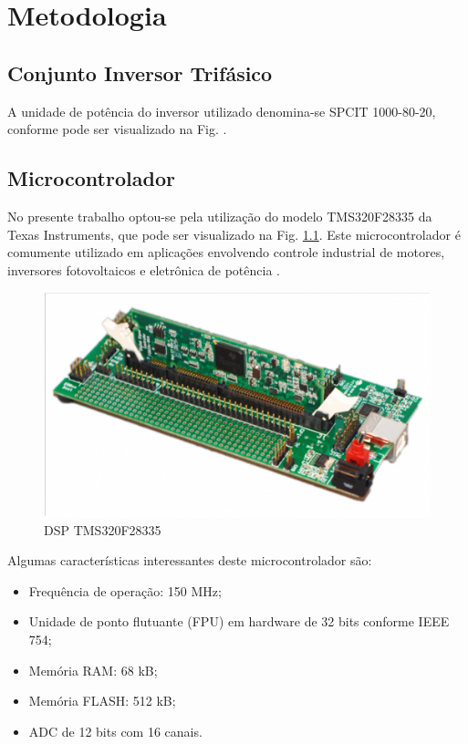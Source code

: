 \chapter{Metodologia}

\section{Conjunto Inversor Trifásico}

A unidade de potência do inversor utilizado denomina-se SPCIT 1000-80-20, conforme pode ser visualizado na Fig. .



\section{Microcontrolador}

No presente trabalho optou-se pela utilização do modelo TMS320F28335 da Texas Instruments, que pode ser visualizado na Fig. \ref{fig:dsp}.
Este microcontrolador é comumente utilizado em aplicações envolvendo controle industrial de motores, inversores fotovoltaicos e eletrônica de potência \cite{texasinstruments:tms320f28335}.

\begin{figure}[!hbt]
    \begin{center}
    \includegraphics[scale=0.3]{figuras/tms320f28335.png}
    \caption{DSP TMS320F28335}
    \label{fig:dsp}
    \end{center}
\end{figure}

Algumas características interessantes deste microcontrolador são:
\begin{itemize}
    \item Frequência de operação: 150 MHz;
    \item Unidade de ponto flutuante (FPU) em hardware de 32 bits conforme IEEE 754;
    \item Memória RAM: 68 kB;
    \item Memória FLASH: 512 kB;
    \item ADC de 12 bits com 16 canais.
\end{itemize}

